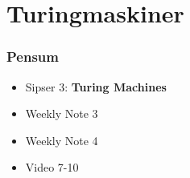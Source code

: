 \section{Turingmaskiner}%
\label{sec:turingmachines}

\begin{frame}
  \frametitle{Pensum}
  \begin{itemize}
    \item Sipser 3: \textbf{Turing Machines}
    \item Weekly Note 3
    \item Weekly Note 4
    \item Video 7-10
  \end{itemize}
\end{frame}



